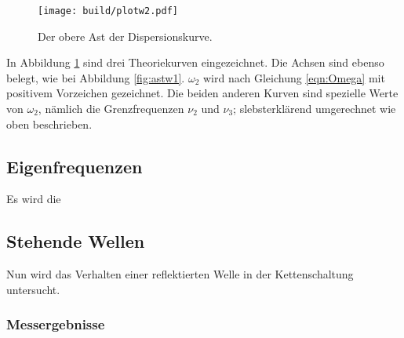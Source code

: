 \begin{figure}
  \centering
  \texttt{[image: build/plotw2.pdf]}
  \caption{Der obere Ast der Dispersionskurve.}
  \label{fig:astw2}
\end{figure}

In Abbildung \ref{fig:astw2} sind drei Theoriekurven eingezeichnet. Die Achsen
sind ebenso belegt, wie bei Abbildung \ref{fig:astw1}.
$\omega_2$ wird nach Gleichung \eqref{eqn:Omega} mit positivem Vorzeichen
gezeichnet. Die beiden anderen Kurven sind spezielle Werte von $\omega_2$,
nämlich die Grenzfrequenzen $\nu_2$ und $\nu_3$; slebsterklärend umgerechnet
wie oben beschrieben.

\subsection{Eigenfrequenzen}
Es wird die 

\subsection{Stehende Wellen}

Nun wird das Verhalten einer reflektierten Welle in der Kettenschaltung
untersucht.

\subsubsection{Messergebnisse}

